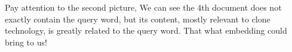 \documentclass[UTF8]{article}
\begin{document}
	\begin{figure}[H]
		\centering
		\centering
	\end{figure}
	Pay attention to the second picture, We can see the 4th document does not exactly contain the query word, but its content, mostly relevant to clone technology, is greatly related to the query word. That what embedding could bring to us!
	
\end{document}
